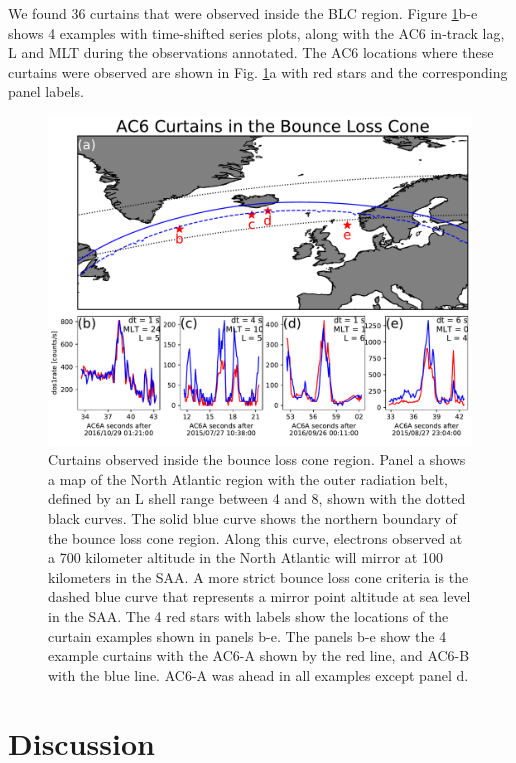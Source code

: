 \documentclass[draft]{agujournal2019}
\begin{document}
We found 36 curtains that were observed inside the BLC region. Figure \ref{fig3}b-e shows 4 examples with time-shifted series plots, along with the AC6 in-track lag, L and MLT during the observations annotated. The AC6 locations where these curtains were observed are shown in Fig. \ref{fig3}a with red stars and the corresponding panel labels.

\begin{figure}
\includegraphics[width=\textwidth]{fig3.pdf}
\caption{Curtains observed inside the bounce loss cone region. Panel a shows a map of the North Atlantic region with the outer radiation belt, defined by an L shell range between 4 and 8, shown with the dotted black curves. The solid blue curve shows the northern boundary of the bounce loss cone region. Along this curve, electrons observed at a 700 kilometer altitude in the North Atlantic will mirror at 100 kilometers in the SAA. A more strict bounce loss cone criteria is the dashed blue curve that represents a mirror point altitude at sea level in the SAA. The 4 red stars with labels show the locations of the curtain examples shown in panels b-e. The panels b-e show the 4 example curtains with the AC6-A shown by the red line, and AC6-B with the blue line. AC6-A was ahead in all examples except panel d.}
\label{fig3}
\end{figure}

\section{Discussion} \label{discussion}
\end{document}
